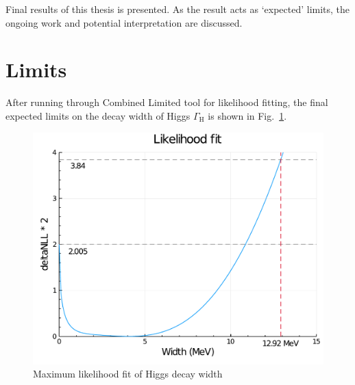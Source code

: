 Final results of this thesis is presented. As the result acts as
`expected' limits, the ongoing work and potential interpretation are discussed.
\section{Limits}
After running through Combined Limited tool for likelihood fitting, the final expected
limits on the decay width of Higgs $\Gamma_\mathrm{H}$ is shown in Fig.~\ref{fig:final_fit}.
\begin{figure}[htb]
\begin{center}
\includegraphics[width=.7\linewidth]{fig/Final_fit.pdf}
\end{center}
\caption{Maximum likelihood fit of Higgs decay width}
\label{fig:final_fit}
\end{figure}
